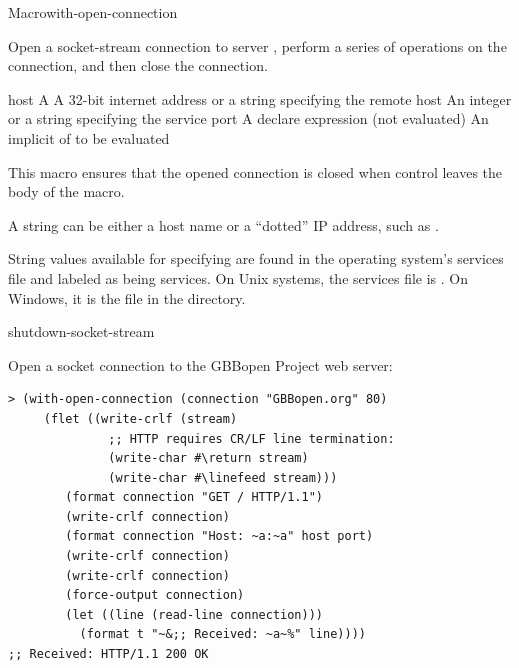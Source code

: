 \documentclass[10pt,twoside,english,pdftex]{article}
\begin{document}

\begin{functiondoc}{Macro}{with-open-connection}%
  {\code{(}\code{)}
    }
%
%
%

\fnsyntax

\fnpurpose Open a socket-stream connection to server ,
perform a series of operations on the connection, and then close the
connection.

\fnpackage {}

\fnmodule {}

\fnargs
\begin{args}{host}
\arg[var] A 
\arg[host] A 32-bit internet address or a string specifying the remote host
\arg[port] An integer or a string specifying the service port
\arg[declaration] A declare expression (not evaluated)
\arg[forms] An implicit  of  to be evaluated
\end{args}

\fndescription This macro ensures that the opened connection is closed when
control leaves the body of the macro.

A  string can be either a host name or a ``dotted'' IP address,
such as .

String values available for specifying  are found in the operating
system's services file and labeled as being  services. On Unix
systems, the services file is . On Windows, it is
the file  in the  directory.

\begin{alsos}{shutdown-socket-stream}
\end{alsos}

\fnexample
Open a socket connection to the GBBopen Project web server:
%
\W\supp
\begin{verbatim}
> (with-open-connection (connection "GBBopen.org" 80)
     (flet ((write-crlf (stream)
              ;; HTTP requires CR/LF line termination: 
              (write-char #\return stream)
              (write-char #\linefeed stream)))
        (format connection "GET / HTTP/1.1")
        (write-crlf connection)
        (format connection "Host: ~a:~a" host port)
        (write-crlf connection)
        (write-crlf connection)
        (force-output connection)
        (let ((line (read-line connection)))
          (format t "~&;; Received: ~a~%" line))))
;; Received: HTTP/1.1 200 OK
\end{verbatim}

\end{functiondoc}
\end{document}
